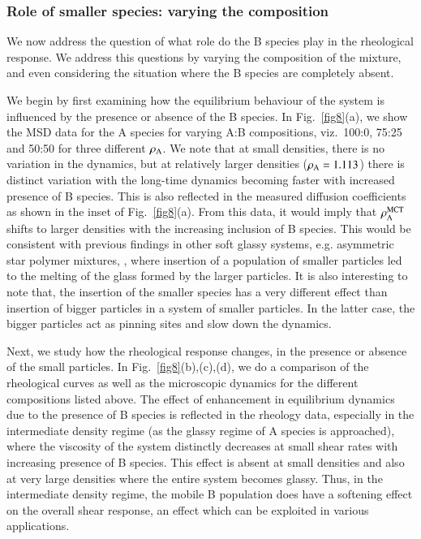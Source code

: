 %
\subsubsection{Role of smaller species: varying the composition}
%
We now address the question of what role do the B species play in the rheological response.  We address this questions by varying the composition of the mixture, and even considering the situation where the B species are completely absent.

We begin by first examining how the equilibrium behaviour of the system is influenced by the presence or absence of the B species. In Fig.~\ref{fig8}(a), we show the MSD data for the A species for varying A:B compositions, viz.~100:0, 75:25 and 50:50 for three different $\rho_{\rm A}$. We note that at small densities, there is no variation in the dynamics, but at relatively larger densities ($\rho_{\rm A} = 1.113$) there is distinct variation with the long-time dynamics becoming faster with increased presence of B species. This is also reflected in the measured diffusion coefficients as shown in the inset of Fig.~\ref{fig8}(a). From this data, it would imply that $\rho_{\rm A}^{\rm MCT}$ shifts to larger densities with the increasing inclusion of B species. This would be consistent with previous findings in other soft glassy systems, e.g. asymmetric star polymer mixtures, \cite{zaccarelli2005}, where insertion of a population of smaller particles led to the melting of the glass formed by the larger particles. It is also interesting to note that, the insertion of the smaller species has a very different effect than insertion of bigger particles in a system of smaller particles. In the latter case, the bigger particles act as pinning sites and slow down the dynamics.

Next, we study how the rheological response changes, in the presence or absence of the small particles. In Fig.~\ref{fig8}(b),(c),(d), we do a comparison of the rheological curves as well as the microscopic dynamics for the different compositions listed above. The effect of enhancement in equilibrium dynamics due to the presence of B species is reflected in the rheology data, especially in the intermediate density regime (as the glassy regime of A species is approached), where the viscosity of the system distinctly decreases at small shear rates with increasing presence of B species. This effect is absent at small densities and also at very large densities where the entire system becomes glassy. Thus, in the intermediate density regime, the mobile B population does have a softening effect on the overall shear response, an effect which can be exploited in various applications.

